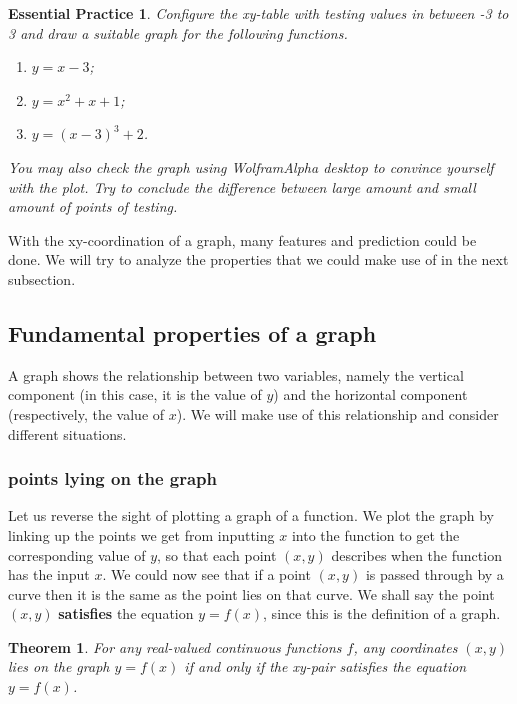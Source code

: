 \documentclass[12pt]{article}
\newtheorem*{theorem}{Theorem}
\newtheorem{exercise}{Essential Practice}[subsubsection]
\begin{document}
    \begin{exercise}
        Configure the xy-table with testing values in between -3 to 3 and draw a suitable graph for the following functions.\begin{enumerate}
            \item $y=x-3$;
            \item $y=x^2+x+1$;
            \item $y=(x-3)^3+2$.
        \end{enumerate}
        You may also check the graph using WolframAlpha desktop to convince yourself with the plot. Try to conclude the difference between large amount and small amount of points of testing.
    \end{exercise}

    With the xy-coordination of a graph, many features and prediction could be done. We will try to analyze the properties that we could make use of in the next subsection.

    \subsection{Fundamental properties of a graph}

    A graph shows the relationship between two variables, namely the vertical component (in this case, it is the value of $y$) and the horizontal component (respectively, the value of $x$). We will make use of this relationship and consider different situations.

    \subsubsection{points lying on the graph}

    Let us reverse the sight of plotting a graph of a function. We plot the graph by linking up the points we get from inputting $x$ into the function to get the corresponding value of $y$, so that each point $(x,y)$ describes when the function has the input $x$. We could now see that if a point $(x,y)$ is passed through by a curve then it is the same as the point lies on that curve. We shall say the point $(x,y)$ \textbf{satisfies} the equation $y=f(x)$, since this is the definition of a graph.

    \begin{theorem}
        For any real-valued continuous functions $f$, any coordinates $(x,y)$ lies on the graph $y=f(x)$ if and only if the xy-pair satisfies the equation $y=f(x)$.
    \end{theorem}
\end{document}
